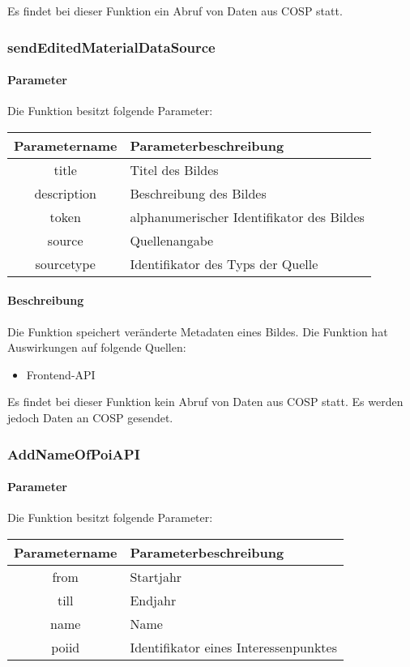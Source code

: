 Es findet bei dieser Funktion ein Abruf von Daten aus {\glqq COSP\grqq} statt.
\subsubsection{sendEditedMaterialDataSource}
\paragraph{Parameter} Die Funktion besitzt folgende Parameter:
\begin{table}[H]
	\begin{tabular}{|c|p{11cm}|}
		\hline
		\textbf{Parametername} & \textbf{Parameterbeschreibung} \\ \hline
		title       & Titel des Bildes \\ \hline
		description & Beschreibung des Bildes \\ \hline
		token       & alphanumerischer Identifikator des Bildes \\ \hline
		source      & Quellenangabe \\ \hline
		sourcetype  & Identifikator des Typs der Quelle \\ \hline
	\end{tabular}
\end{table}
\paragraph{Beschreibung} Die Funktion speichert veränderte Metadaten eines Bildes. Die Funktion hat Auswirkungen auf folgende Quellen:
\begin{itemize}
	\item Frontend-API
\end{itemize}
Es findet bei dieser Funktion kein Abruf von Daten aus {\glqq COSP\grqq} statt. Es werden jedoch Daten an {\glqq COSP\grqq} gesendet.

\subsubsection{AddNameOfPoiAPI}
\paragraph{Parameter} Die Funktion besitzt folgende Parameter:
\begin{table}[H]
	\begin{tabular}{|c|p{11cm}|}
		\hline
		\textbf{Parametername} & \textbf{Parameterbeschreibung} \\ \hline
		from  & Startjahr \\ \hline
		till  & Endjahr \\ \hline
		name  & Name \\ \hline
		poiid & Identifikator eines Interessenpunktes \\ \hline
	\end{tabular}
\end{table}
